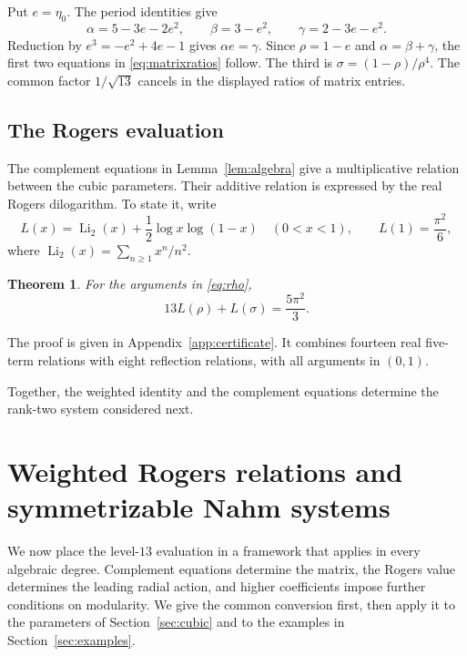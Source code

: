 \documentclass[11pt,reqno]{amsart}
\newtheorem{theorem}{Theorem}[section]
\theoremstyle{remark}
\numberwithin{equation}{section}
\DeclareMathOperator{\Li}{Li}
\begin{document}
Put $e=\eta_0$. The period identities give
\[
 \alpha=5-3e-2e^2,\qquad \beta=3-e^2,\qquad \gamma=2-3e-e^2.
\]
Reduction by $e^3=-e^2+4e-1$ gives $\alpha e=\gamma$.
Since $\rho=1-e$ and $\alpha=\beta+\gamma$, the first two equations in
\eqref{eq:matrixratios} follow. The third is
$\sigma=(1-\rho)/\rho^4$. The common factor $1/\sqrt{13}$ cancels in
the displayed ratios of matrix entries.

\subsection{The Rogers evaluation}
The complement equations in Lemma~\ref{lem:algebra} give a multiplicative
relation between the cubic parameters. Their additive relation is expressed
by the real Rogers dilogarithm. To state it, write
\begin{equation}\label{eq:Rogersdefinition}
 L(x)=\Li_2(x)+\frac12\log x\log(1-x)\quad(0<x<1),\qquad
 L(1)=\frac{\pi^2}{6},
\end{equation}
where $\Li_2(x)=\sum_{n\geq1}x^n/n^2$.

\begin{theorem}\label{thm:dilog}
For the arguments in \eqref{eq:rho},
\begin{equation}\label{eq:dilog}
 13L(\rho)+L(\sigma)=\frac{5\pi^2}{3}.
\end{equation}
\end{theorem}
The proof is given in Appendix~\ref{app:certificate}. It combines fourteen
real five-term relations with eight reflection relations, with all arguments
in $(0,1)$.

Together, the weighted identity and the complement equations determine
the rank-two system considered next.

\section{Weighted Rogers relations and symmetrizable Nahm systems}
\label{sec:framework}
We now place the level-$13$ evaluation in a framework that applies in
every algebraic degree. Complement equations determine the matrix,
the Rogers value determines the leading radial action, and higher
coefficients impose further conditions on modularity. We give the
common conversion first, then apply it to the parameters of
Section~\ref{sec:cubic} and to the examples in
Section~\ref{sec:examples}.
\end{document}
